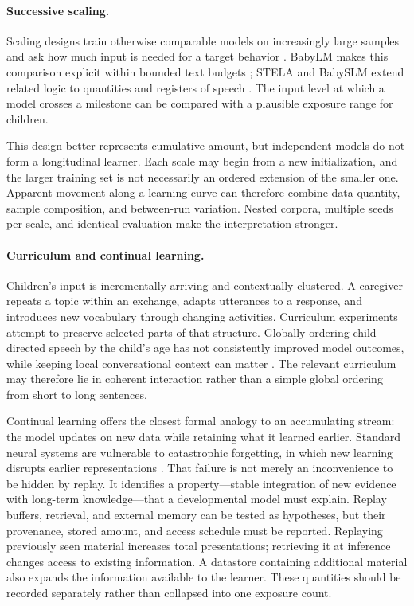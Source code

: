 \paragraph{Successive scaling.}
Scaling designs train otherwise comparable models on increasingly large samples and ask how much input is needed for a target behavior \citep{warstadt2020learning}. BabyLM makes this comparison explicit within bounded text budgets \citep{warstadt2023findings,hu2024findings}; STELA and BabySLM extend related logic to quantities and registers of speech \citep{lavechin2023babyslm,lavechin2024modeling}. The input level at which a model crosses a milestone can be compared with a plausible exposure range for children.

This design better represents cumulative amount, but independent models do not form a longitudinal learner. Each scale may begin from a new initialization, and the larger training set is not necessarily an ordered extension of the smaller one. Apparent movement along a learning curve can therefore combine data quantity, sample composition, and between-run variation. Nested corpora, multiple seeds per scale, and identical evaluation make the interpretation stronger.

\paragraph{Curriculum and continual learning.}
Children's input is incrementally arriving and contextually clustered. A caregiver repeats a topic within an exchange, adapts utterances to a response, and introduces new vocabulary through changing activities. Curriculum experiments attempt to preserve selected parts of that structure. Globally ordering child-directed speech by the child's age has not consistently improved model outcomes, while keeping local conversational context can matter \citep{feng2024child}. The relevant curriculum may therefore lie in coherent interaction rather than a simple global ordering from short to long sentences.

Continual learning offers the closest formal analogy to an accumulating stream: the model updates on new data while retaining what it learned earlier. Standard neural systems are vulnerable to catastrophic forgetting, in which new learning disrupts earlier representations \citep{mccloskey1989catastrophic}. That failure is not merely an inconvenience to be hidden by replay. It identifies a property---stable integration of new evidence with long-term knowledge---that a developmental model must explain. Replay buffers, retrieval, and external memory can be tested as hypotheses, but their provenance, stored amount, and access schedule must be reported. Replaying previously seen material increases total presentations; retrieving it at inference changes access to existing information. A datastore containing additional material also expands the information available to the learner. These quantities should be recorded separately rather than collapsed into one exposure count.

